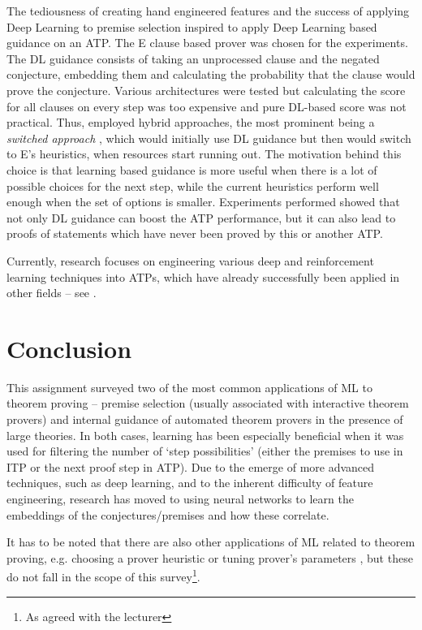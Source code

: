 \documentclass{article}
\begin{document}
The tediousness of creating hand engineered features and the success of
applying Deep Learning to premise selection \citep{DeepMath} inspired
\cite{DNGPS} to apply Deep Learning based guidance on an ATP. The E clause
based prover was chosen for the experiments. The DL guidance consists of taking
an unprocessed clause and the negated conjecture, embedding them and
calculating the probability that the clause would prove the conjecture.
Various architectures were tested but calculating the score for all clauses on
every step was too expensive and pure DL-based score was not practical. Thus,
\cite{DNGPS} employed hybrid approaches, the most prominent being
a \emph{switched approach} \cite[s. 5.2.1, p.10]{DNGPS}, which would initially
use DL guidance but then would switch to E's heuristics, when resources start
running out. The motivation behind this choice is that learning based guidance
is more useful when there is a lot of possible choices for the next step, while
the current heuristics perform well enough when the set of options is smaller.
Experiments performed showed that not only DL guidance can boost the ATP
performance, but it can also lead to proofs of statements which have never been
proved by this or another ATP.

Currently, research focuses on engineering various deep and reinforcement
learning techniques into ATPs, which have already successfully been applied in
other fields -- see \cite{RLTP, DRL, GuidingTPbyRNNs}. 

\section{Conclusion}\label{sec:conclusion}

This assignment surveyed two of the most common applications of ML to theorem
proving -- premise selection (usually associated with interactive theorem
provers) and internal guidance of automated theorem provers in the presence of
large theories. In both cases, learning has been especially beneficial when it
was used for filtering the number of `step possibilities' (either the premises
to use in ITP or the next proof step in ATP). Due to the emerge of more
advanced techniques, such as deep learning, and to the inherent difficulty of
feature engineering, research has moved to using neural networks to learn the
embeddings of the conjectures/premises and how these correlate.

It has to be noted that there are also other applications of ML related to
theorem proving, e.g. choosing a prover heuristic \citep{LearningToSelect} or
tuning prover's parameters \citep{MaLeS}, but these do not fall in the scope of
this survey\footnote{As agreed with the lecturer}.
\end{document}
